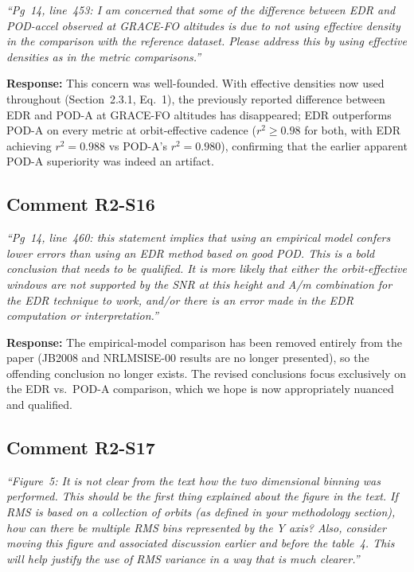 \documentclass[11pt]{article}
\newcommand{\reviewercomment}[1]{%
  \medskip
  \noindent\textit{\color{reviewblue}#1}%
  \medskip
}
\begin{document}
\reviewercomment{%
``Pg~14, line~453: I am concerned that some of the difference between EDR and POD-accel observed at GRACE-FO altitudes is due to not using effective density in the comparison with the reference dataset. Please address this by using effective densities as in the metric comparisons.''}

\textbf{Response:}
This concern was well-founded. With effective densities now used throughout (Section~2.3.1, Eq.~1), the previously reported difference between EDR and POD-A at GRACE-FO altitudes has disappeared; EDR outperforms POD-A on every metric at orbit-effective cadence ($r^2 \geq 0.98$ for both, with EDR achieving $r^2 = 0.988$ vs POD-A's $r^2 = 0.980$), confirming that the earlier apparent POD-A superiority was indeed an artifact.


\subsection{Comment R2-S16}

\reviewercomment{%
``Pg~14, line~460: this statement implies that using an empirical model confers lower errors than using an EDR method based on good POD. This is a bold conclusion that needs to be qualified. It is more likely that either the orbit-effective windows are not supported by the SNR at this height and A/m combination for the EDR technique to work, and/or there is an error made in the EDR computation or interpretation.''}

\textbf{Response:}
The empirical-model comparison has been removed entirely from the paper (JB2008 and NRLMSISE-00 results are no longer presented), so the offending conclusion no longer exists. The revised conclusions focus exclusively on the EDR vs.\ POD-A comparison, which we hope is now appropriately nuanced and qualified.

\subsection{Comment R2-S17}

\reviewercomment{%
``Figure~5: It is not clear from the text how the two dimensional binning was performed. This should be the first thing explained about the figure in the text. If RMS is based on a collection of orbits (as defined in your methodology section), how can there be multiple RMS bins represented by the Y axis? Also, consider moving this figure and associated discussion earlier and before the table~4. This will help justify the use of RMS variance in a way that is much clearer.''}
\end{document}
